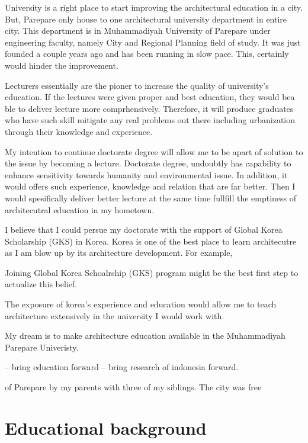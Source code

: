 \documentclass[11pt]{simart} %
\begin{document}
University is a right place to start improving the architectural education in a city.
But, Parepare only house to one architectural university department in entire city.
This department is in Muhammadiyah University of Parepare under engineering faculty, namely City and Regional Planning field of study.
It was just founded a couple years ago and has been running in slow pace. This, certainly would hinder the improvement.

Lecturers essentially are the pioner to increase the quality of university's education.
If the lectures were given proper and best education, they would bea ble to deliver lecture more comprhensively.
Therefore, it will produce graduates who have such skill mitigate any real problems out there including urbanization through their knowledge and experience.

My intention to continue doctorate degree will allow me to be apart of solution to the issue by becoming a lecture.
Doctorate degree, undoubtly has capability to enhance sensitivity towards humanity and environmental issue.
In addition, it would offers such experience, knowledge and relation that are far better.
Then I would spesifically deliver better lecture at the same time fullfill the emptiness of architecutral education in my hometown.


I believe that I could persue my doctorate with the support of Global Korea Scholarship (GKS) in Korea. Korea is one of the best place to learn architecutre as I am blow up by its architecture development. For example,

Joining Global Korea Schoalrship (GKS) program might be the best first step to actualize this belief.

The exposure of korea's experience and education would allow me to teach architecture extensively in the university I would work with.


My dream is to make architecture education  available in the Muhammadiyah Parepare Univeristy.


-- bring education forward
-- bring research of indonesia forward.

of Parepare by my parents with three of my siblings.
The city was free

\section{Educational background}
\end{document}

